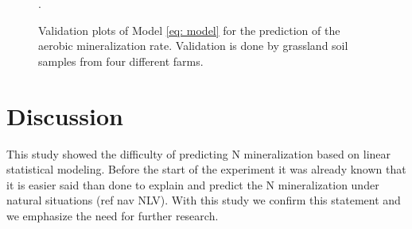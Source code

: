 \documentclass[10pt,twoside,dutch,english]{report}
\begin{document}
\begin{figure}
  \label{fig:val_pm}
\quad
{}
  \label{fig:val_ncum}
\caption{Validation plots of Model \ref{eq: model} for the prediction of the aerobic mineralization rate. Validation is done by grassland soil samples from four different farms.}. 
\label{fig:results_val}		
\end{figure}


	

	
	
	


\chapter{Discussion}
This study showed the difficulty of predicting N mineralization based on linear statistical modeling. Before the start of the experiment it was already known that it is easier said than done to explain and predict the N mineralization under natural situations (ref nav NLV). With this study we confirm this statement and we emphasize the need for further research. 
\end{document}
